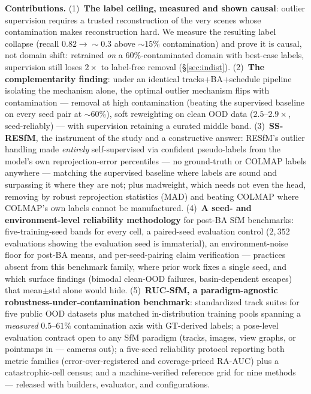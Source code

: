\documentclass{article}
\newcommand{\mad}{madweight}
\begin{document}
\noindent\textbf{Contributions.}
(1)~\textbf{The label ceiling, measured and shown causal}: outlier supervision requires a
trusted reconstruction of the very scenes whose contamination makes reconstruction hard.
We measure the resulting label collapse (recall $0.82\!\to\!\sim\!0.3$ above
${\sim}15\%$ contamination) and prove it is causal, not domain shift: retrained
\emph{on} a $60\%$-contaminated domain with best-case labels, supervision still loses
$2\times$ to label-free removal (\S\ref{sec:indist}).
(2)~\textbf{The complementarity finding}: under an identical tracks+BA+schedule pipeline
isolating the mechanism alone, the optimal outlier mechanism flips with contamination ---
removal at high contamination (beating the supervised baseline on every seed pair at
$\sim\!60\%$), soft reweighting on clean OOD data ($2.5$--$2.9\times$, seed-reliably) ---
with supervision retaining a curated middle band.
(3)~\textbf{SS-RESfM}, the instrument of the study and a constructive answer: RESfM's
outlier handling made \emph{entirely} self-supervised via confident pseudo-labels from
the model's own reprojection-error percentiles --- no ground-truth or COLMAP labels
anywhere --- matching the supervised baseline where labels are sound and surpassing it
where they are not; plus \mad{}, which needs not even the head, removing by robust
reprojection statistics (MAD) and beating COLMAP where COLMAP's own labels cannot be
manufactured.
(4)~\textbf{A seed- and environment-level reliability methodology} for post-BA SfM
benchmarks: five-training-seed bands for every cell, a paired-seed evaluation control
($2{,}352$ evaluations showing the evaluation seed is immaterial), an
environment-noise floor for post-BA means, and per-seed-pairing claim verification ---
practices absent from this benchmark family, where prior work fixes a single seed, and
which surface findings (bimodal clean-OOD failures, basin-dependent escapes) that
mean$\pm$std alone would hide.
(5)~\textbf{RUC-SfM, a paradigm-agnostic robustness-under-contamination benchmark}:
standardized track suites for five public OOD datasets plus matched in-distribution
training pools spanning a \emph{measured} $0.5$--$61\%$ contamination axis with
GT-derived labels; a pose-level evaluation contract open to any SfM paradigm (tracks,
images, view graphs, or pointmaps in --- cameras out); a five-seed reliability
protocol reporting both metric families (error-over-registered and coverage-priced
RA-AUC) plus a catastrophic-cell census; and a machine-verified reference grid for
nine methods --- released with builders, evaluator, and configurations.
\end{document}
